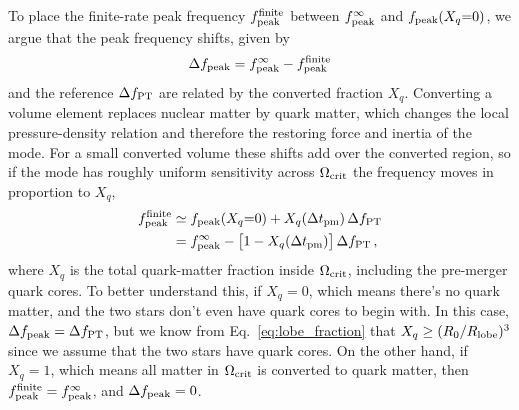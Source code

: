 \documentclass[10pt,superscriptaddress,
amsmath,aps,prc,twocolumn,nofootinbib,floatfix]{revtex4-1}
\begin{document}
{To place the finite-rate peak frequency $f_{\rm peak}^{\rm finite}$ between $f^\infty_{\rm peak}$ and $f_{\rm peak}(X_q{=}0)$, we argue that the peak frequency shifts, given by 
\begin{equation}
\Delta f_{\rm peak} = f^{\infty}_{\rm peak} - f^{\rm finite}_{\rm peak}
\label{eq:Delta_f_peak}
\end{equation}
and the reference $\Delta f_{\rm PT}$ are related by the converted fraction $X_q$.
Converting a volume element replaces nuclear matter by quark matter, which changes the local pressure-density relation and therefore the restoring force and inertia of the mode.
For a small converted volume these shifts add over the converted region, so if the mode has roughly uniform sensitivity across $\Omega_{\rm crit}$ the frequency moves in proportion to $X_q$,
\begin{equation}
\begin{aligned}
f_{\rm peak}^{\rm finite}
&\simeq
f_{\rm peak}(X_q{=}0)+X_q(\Delta t_{\rm pm})\,\Delta f_{\rm PT}
\\
&=
f_{\rm peak}^{\infty}-\bigl[1-X_q(\Delta t_{\rm pm})\bigr]\,\Delta f_{\rm PT}\,,
\end{aligned}
\label{eq:finite_peak_frequency}
\end{equation}
where $X_q$ is the total quark-matter fraction inside $\Omega_{\rm crit}$, including the pre-merger quark cores.
To better understand this, if $X_q = 0$, which means there's no quark matter, and the two stars don't even have quark cores to begin with. 
In this case, $\Delta f_{\rm peak} = \Delta f_{\rm PT}$, but we know from Eq.~\eqref{eq:lobe_fraction} that $X_q\geq (R_0/R_{\rm lobe})^3$ since we assume that the two stars have quark cores.
On the other hand, if $X_q = 1$, which means all matter in $\Omega_{\rm crit}$ is converted to quark matter, then $f_{\rm peak}^{\rm finite} = f_{\rm peak}^{\infty}$, and $\Delta f_{\rm peak} = 0$.

}
\end{document}
